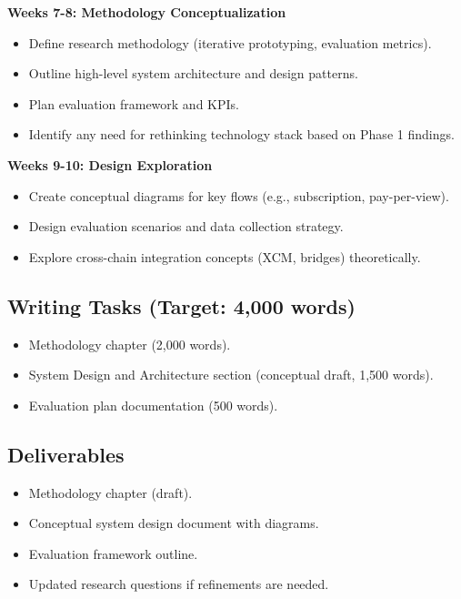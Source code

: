 \documentclass[12pt,a4paper]{article}
\begin{document}
\textbf{Weeks 7-8: Methodology Conceptualization}
\begin{itemize}
    \item Define research methodology (iterative prototyping, evaluation metrics).
    \item Outline high-level system architecture and design patterns.
    \item Plan evaluation framework and KPIs.
    \item Identify any need for rethinking technology stack based on Phase 1 findings.
\end{itemize}

\textbf{Weeks 9-10: Design Exploration}
\begin{itemize}
    \item Create conceptual diagrams for key flows (e.g., subscription, pay-per-view).
    \item Design evaluation scenarios and data collection strategy.
    \item Explore cross-chain integration concepts (XCM, bridges) theoretically.
\end{itemize}

\subsection*{Writing Tasks (Target: 4,000 words)}

\begin{itemize}
    \item Methodology chapter (2,000 words).
    \item System Design and Architecture section (conceptual draft, 1,500 words).
    \item Evaluation plan documentation (500 words).
\end{itemize}

\subsection*{Deliverables}

\begin{itemize}
    \item Methodology chapter (draft).
    \item Conceptual system design document with diagrams.
    \item Evaluation framework outline.
    \item Updated research questions if refinements are needed.
\end{itemize}
\end{document}
